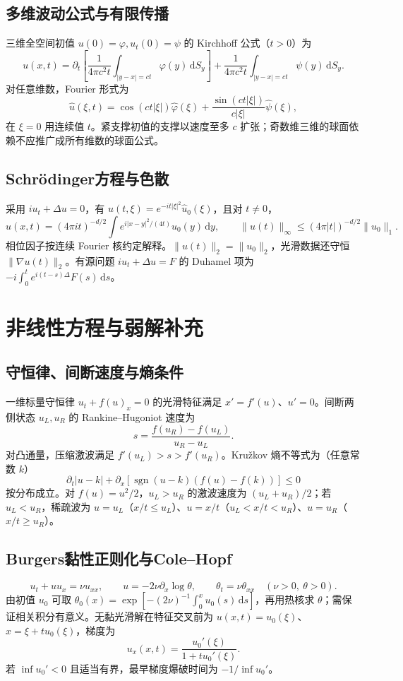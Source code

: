 \documentclass[../main.tex]{subfiles}
\begin{document}
\subsection{多维波动公式与有限传播}
三维全空间初值 $u(0)=\varphi,u_t(0)=\psi$ 的 Kirchhoff 公式（$t>0$）为
\[
u(x,t)=\partial_t\left[\frac1{4\pi c^2t}\int_{|y-x|=ct}\varphi(y)\,\mathrm dS_y\right]
+\frac1{4\pi c^2t}\int_{|y-x|=ct}\psi(y)\,\mathrm dS_y.
\]
对任意维数，Fourier 形式为
\[
\widehat u(\xi,t)=\cos(ct|\xi|)\widehat\varphi(\xi)
+\frac{\sin(ct|\xi|)}{c|\xi|}\widehat\psi(\xi),
\]
在 $\xi=0$ 用连续值 $t$。紧支撑初值的支撑以速度至多 $c$ 扩张；奇数维三维的球面依赖不应推广成所有维数的球面公式。
\subsection{Schrödinger方程与色散}
采用 $iu_t+\Delta u=0$，有 $\widehat u(t,\xi)=e^{-it|\xi|^2}\widehat u_0(\xi)$，且对 $t\ne0$，
\[
u(x,t)=(4\pi it)^{-d/2}\int e^{i|x-y|^2/(4t)}u_0(y)\,\mathrm dy,
\qquad\|u(t)\|_\infty\le(4\pi|t|)^{-d/2}\|u_0\|_1.
\]
相位因子按连续 Fourier 核约定解释。$\|u(t)\|_2=\|u_0\|_2$，光滑数据还守恒 $\|\nabla u(t)\|_2$。有源问题 $iu_t+\Delta u=F$ 的 Duhamel 项为 $-i\int_0^te^{i(t-s)\Delta}F(s)\,\mathrm ds$。
\section{非线性方程与弱解补充}
\subsection{守恒律、间断速度与熵条件}
一维标量守恒律 $u_t+f(u)_x=0$ 的光滑特征满足 $x'=f'(u)$、$u'=0$。间断两侧状态 $u_L,u_R$ 的 Rankine--Hugoniot 速度为
\[
s=\frac{f(u_R)-f(u_L)}{u_R-u_L}.
\]
对凸通量，压缩激波满足 $f'(u_L)>s>f'(u_R)$。Kružkov 熵不等式为（任意常数 $k$）
\[
\partial_t|u-k|+\partial_x[\operatorname{sgn}(u-k)(f(u)-f(k))]\le0
\]
按分布成立。对 $f(u)=u^2/2$，$u_L>u_R$ 的激波速度为 $(u_L+u_R)/2$；若 $u_L<u_R$，稀疏波为 $u=u_L$（$x/t\le u_L$）、$u=x/t$（$u_L<x/t<u_R$）、$u=u_R$（$x/t\ge u_R$）。
\subsection{Burgers黏性正则化与Cole--Hopf}
\[
u_t+uu_x=\nu u_{xx},\qquad u=-2\nu\partial_x\log\theta,\qquad
\theta_t=\nu\theta_{xx}\quad(\nu>0,\ \theta>0).
\]
由初值 $u_0$ 可取 $\theta_0(x)=\exp[-(2\nu)^{-1}\int_0^xu_0(s)\,\mathrm ds]$，再用热核求 $\theta$；需保证相关积分有意义。无黏光滑解在特征交叉前为 $u(x,t)=u_0(\xi)$、$x=\xi+tu_0(\xi)$，梯度为
\[
u_x(x,t)=\frac{u_0'(\xi)}{1+tu_0'(\xi)}.
\]
若 $\inf u_0'<0$ 且适当有界，最早梯度爆破时间为 $-1/\inf u_0'$。
\end{document}
